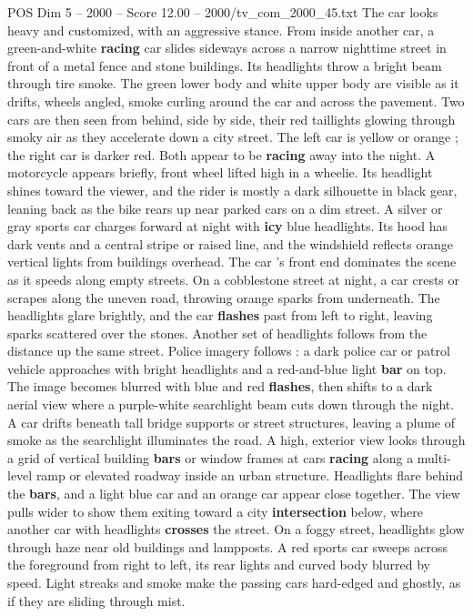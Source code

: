 \begin{textsample}{POS Dim 5 – 2000 – Score 12.00 – 2000/tv\_com\_2000\_45.txt}
The car looks heavy and customized, with an aggressive stance.
From inside another car, a green-and-white \textbf{racing} car slides sideways across a narrow nighttime street in front of a metal fence and stone buildings.
Its headlights throw a bright beam through tire smoke.
The green lower body and white upper body are visible as it drifts, wheels angled, smoke curling around the car and across the pavement.
Two cars are then seen from behind, side by side, their red taillights glowing through smoky air as they accelerate down a city street.
The left car is yellow or orange ; the right car is darker red.
Both appear to be \textbf{racing} away into the night.
A motorcycle appears briefly, front wheel lifted high in a wheelie.
Its headlight shines toward the viewer, and the rider is mostly a dark silhouette in black gear, leaning back as the bike rears up near parked cars on a dim street.
A silver or gray sports car charges forward at night with \textbf{icy} blue headlights.
Its hood has dark vents and a central stripe or raised line, and the windshield reflects orange vertical lights from buildings overhead.
The car ’s front end dominates the scene as it speeds along empty streets.
On a cobblestone street at night, a car crests or scrapes along the uneven road, throwing orange sparks from underneath.
The headlights glare brightly, and the car \textbf{flashes} past from left to right, leaving sparks scattered over the stones.
Another set of headlights follows from the distance up the same street.
Police imagery follows : a dark police car or patrol vehicle approaches with bright headlights and a red-and-blue light \textbf{bar} on top.
The image becomes blurred with blue and red \textbf{flashes}, then shifts to a dark aerial view where a purple-white searchlight beam cuts down through the night.
A car drifts beneath tall bridge supports or street structures, leaving a plume of smoke as the searchlight illuminates the road.
A high, exterior view looks through a grid of vertical building \textbf{bars} or window frames at cars \textbf{racing} along a multi-level ramp or elevated roadway inside an urban structure.
Headlights flare behind the \textbf{bars}, and a light blue car and an orange car appear close together.
The view pulls wider to show them exiting toward a city \textbf{intersection} below, where another car with headlights \textbf{crosses} the street.
On a foggy street, headlights glow through haze near old buildings and lampposts.
A red sports car sweeps across the foreground from right to left, its rear lights and curved body blurred by speed.
Light streaks and smoke make the passing cars hard-edged and ghostly, as if they are sliding through mist.

\end{textsample}
